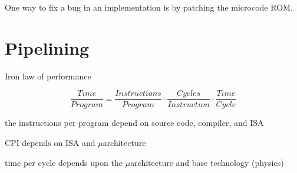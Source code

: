 One way to fix a bug in an implementation is by patching the microcode ROM.

\section{Pipelining}


Iron law of performance

$$\frac{Time}{Program} = \frac{Instructions}{Program} \cdot \frac{Cycles}{Instruction} \cdot \frac{Time}{Cycle}$$

the instructions per program depend on source code, compiler, and ISA

CPI depends on ISA and $\mu$architecture

time per cycle depends upon the $\mu$architecture and base technology (physics)

